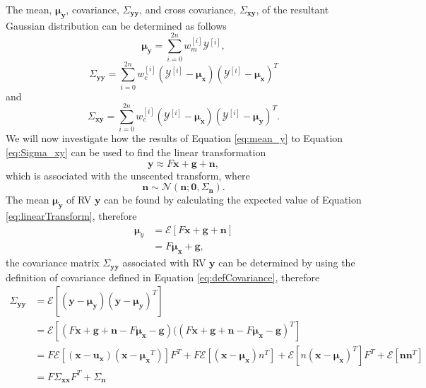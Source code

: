 \documentclass[12pt,oneside,openany,a4paper, %
afrikaans,english,
]{memoir}
\numberwithin{equation}{chapter}
\begin{document}
The mean, $\bm{\mu_{y}}$, covariance, $\Sigma_{\bm{yy}}$, and cross covariance, $\Sigma_{\bm{xy}}$, of the resultant Gaussian distribution can be determined as follows
\begin{equation}\label{eq:mean_y}
\bm{\mu}_{\bm{y}} = \sum_{i = 0}^{2n}w_m^{[i]}\mathcal{Y}^{[i]},
\end{equation}
\begin{equation}\label{eq:Sigma_yy}
\Sigma_{\bm{yy}} = \sum_{i=0}^{2n}w_c^{[i]}\left(\mathcal{Y}^{[i]} - \bm{\mu_{x}}\right) \left(\mathcal{Y}^{[i]} - \bm{\mu_{x}}\right)^T
\end{equation}
and
\begin{equation}\label{eq:Sigma_xy}
\Sigma_{\bm{xy}}= \sum_{i=0}^{2n}w_c^{[i]}\left(\mathcal{Y}^{[i]} - \bm{\mu_{x}}\right) \left(\mathcal{Y}^{[i]} - \bm{\mu_{y}}\right)^T.
\end{equation}
We will now investigate how the results of Equation \ref{eq:mean_y} to Equation \ref{eq:Sigma_xy} can be used to find the linear transformation 
\begin{equation}\label{eq:linearTransform}
\bm{y} \approx F\bm{x} + \bm{g} + \bm{n},
\end{equation}
which is associated with the unscented transform,
where
\begin{equation}
\bm{n} \sim \mathcal{N}(\bm{n}; \bm{0}, \Sigma_{\bm{n}}).
\end{equation}
The mean $\bm{\mu_y}$ of RV $\bm{y}$ can be found by calculating the expected value of Equation \ref{eq:linearTransform}, therefore
\begin{equation}\label{eq:mean_y2}
\begin{split}
\bm{\mu}_y & = \mathcal{E}[F\bm{x} + \bm{g} + \bm{n}]\\
& = F\bm{\mu_x} + \bm{g},
\end{split}
\end{equation}
the covariance matrix $\Sigma_{\bm{yy}}$ associated with RV $\bm{y}$ can be determined by using the definition of covariance defined in Equation \ref{eq:defCovariance}, therefore
\begin{equation}
\begin{split}
\Sigma_{\bm{yy}} & = \mathcal{E}\left[(\bm{y} - \bm{\mu_y})(\bm{y} - \bm{\mu_y})^T\right]\\
& = \mathcal{E}\left[(F\bm{x} + \bm{g} + \bm{n} - F\bm{\mu_x} - \bm{g})((F\bm{x} + \bm{g} + \bm{n} - F\bm{\mu_x} - \bm{g})^T\right]\\
& = F\mathcal{E}\left[(\bm{x} - \bm{u_x})(\bm{x} - \bm{\mu_x}^T)\right]F^T + F\mathcal{E}\left[(\bm{x} - \bm{\mu_x})n^T\right] + \mathcal{E}\left[n(\bm{x} - \bm{\mu_x})^T\right]F^T + \mathcal{E}\left[\bm{nn}^T\right]\\
& = F \Sigma_{\bm{xx}} F^T + \Sigma_{\bm{n}}
\end{split}
\end{equation}
\end{document}
